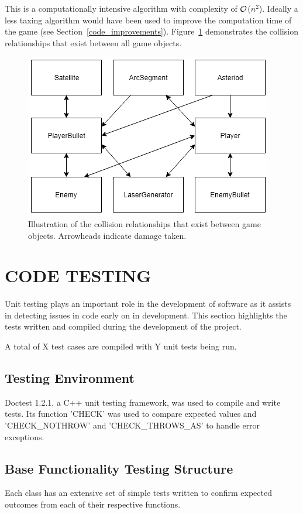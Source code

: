 \documentclass[10pt,twocolumn]{witseiepaper}
\begin{document}
This is a computationally intensive algorithm with complexity of $\cal{O}$($n^{2}$). Ideally a less taxing algorithm would have been used to improve the computation time of the game (see Section~\ref{code_improvements}). Figure~\ref{fig:collisions} demonstrates the collision relationships that exist between all game objects.

\begin{figure}[h]
	\centering
	\includegraphics[width=0.9\columnwidth]{collisions.png}
	\caption{Illustration of the collision relationships that exist between game objects. Arrowheads indicate damage taken.}
	\raggedright
	\label{fig:collisions}
\end{figure}


\section{CODE TESTING}
Unit testing plays an important role in the development of software as it assists in detecting issues in code early on in development.
This section highlights the tests written and compiled during the development of the project. 

A total of X test cases are compiled with Y unit tests being run.

\subsection{Testing Environment}
Doctest 1.2.1, a C++ unit testing framework, was used to compile and write tests. Its function 'CHECK' was used to compare expected values and 'CHECK\_NOTHROW' and 'CHECK\_THROWS\_AS' to handle error exceptions.
 
\subsection{Base Functionality Testing Structure}
Each class has an extensive set of simple tests written to confirm expected outcomes from each of their respective functions. 
\end{document}
